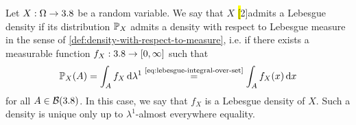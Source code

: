 

\begin{definition}\label{def:density-of-distribution}
Let $X : \Omega \to 3.8$ be a random variable.
We say that $X$ \hl[2]{admits a Lebesgue density} if its distribution $\mathbb{P}_X$ admits a density with respect to Lebesgue measure in the sense of \autoref{def:density-with-respect-to-measure}, i.e. if there exists a measurable function $f_X : 3.8 \to [0,\infty]$ such that
\begin{equation}\label{eq:distribution-density}
\mathbb{P}_X(A)
=
\int_A f_X\,\mathrm{d}\lambda^1
\overset{\text{\eqref{eq:lebesgue-integral-over-set}}}{=}
\int_A f_X(x)\,\mathrm{d} x
\end{equation}
for all $A \in \mathcal{B}(3.8)$.
In this case, we say that $f_X$ is a Lebesgue density of $X$.
Such a density is unique only up to $\lambda^1$-almost everywhere equality.
\end{definition}

